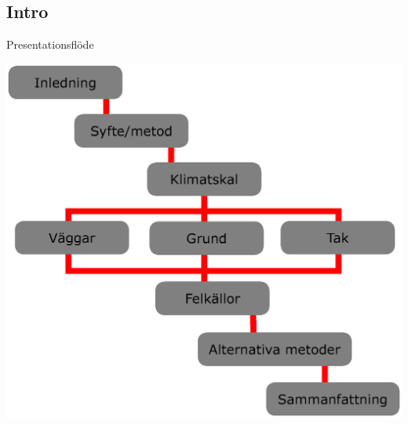 \subsection{Intro}

\begin{frame}{Presentationsflöde}

\begin{center}
\vskip-10pt
\includegraphics[scale=0.4]{images/upplagg.eps}
\end{center}

\end{frame}
